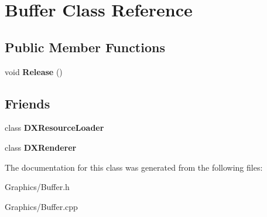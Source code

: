 \hypertarget{classBuffer}{}\section{Buffer Class Reference}
\label{classBuffer}
\subsection*{Public Member Functions}
\begin{DoxyCompactItemize}
\item 
\mbox{\label{classBuffer_aaeb3b3f04ba947f13ca177c33605a384}} 
void {\bfseries Release} ()
\end{DoxyCompactItemize}
\subsection*{Friends}
\begin{DoxyCompactItemize}
\item 
\mbox{\label{classBuffer_a871268c492209c5a9db9dc2db99f4d04}} 
class {\bfseries D\+X\+Resource\+Loader}
\item 
\mbox{\label{classBuffer_a14ab6f966322dccbf6597d0c82bf48c6}} 
class {\bfseries D\+X\+Renderer}
\end{DoxyCompactItemize}


The documentation for this class was generated from the following files\+:\begin{DoxyCompactItemize}
\item 
Graphics/Buffer.\+h\item 
Graphics/Buffer.\+cpp\end{DoxyCompactItemize}
